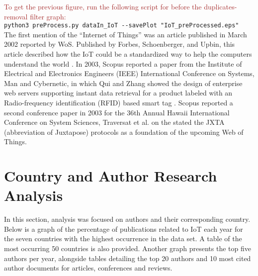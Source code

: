 \documentclass[symmetry,article,accept,moreauthors,pdftex10pt,a4paper]{mdpi}
\begin{document}
\noindent
\textcolor{brown}{To get the previous figure, run the following script for before the duplicates-removal filter graph:}\\
\hspace*{0.5cm}\verb|python3 preProcess.py dataIn_IoT --savePlot "IoT_preProcessed.eps"|\\



The first mention of the ``Internet of Things'' was an article published in March 2002 reported by WoS. Published by Forbes, Schoenberger, and Upbin, this article described how the IoT could be a standardized way to help the computers understand the world \cite{ISI:000174207300032}. In 2003, Scopus reported a paper from the Institute of Electrical and Electronics Engineers (IEEE) International Conference on Systems, Man and Cybernetic, in which Qui and Zhang showed the design of enterprise web servers supporting instant data retrieval for a product labeled with an Radio-frequency identification (RFID) based smart tag \cite{Qiu20032661}. Scopus reported a second conference paper in 2003 for the 36th Annual Hawaii International Conference on System Sciences, Traversat et al. on the stated the JXTA (abbreviation of Juxtapose) protocols as a foundation of the upcoming Web of Things\cite{Traversat2003}. 


\section{Country and Author Research Analysis}

In this section, analysis was focused on authors and their corresponding country. Below is a graph of the percentage of publications related to IoT each year for the seven countries with the highest occurrence in the data set. A table of the most occurring 50 countries is also provided. Another graph presents the top five authors per year, alongside tables detailing the top 20 authors and 10 most cited author documents for articles, conferences and reviews. 
\end{document}
